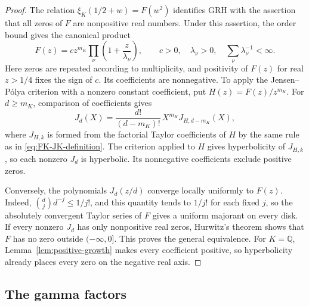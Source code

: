 \documentclass[11pt,reqno]{amsart}
\numberwithin{equation}{section}
\begin{document}
\begin{proof}
The relation $\xi_K(1/2+w)=F(w^2)$ identifies GRH with the
assertion that all zeros of $F$ are nonpositive real numbers.
Under this assertion, the order bound gives the canonical product
\[
 F(z)=c z^{m_K}\prod_{\nu}\left(1+\frac z{\lambda_\nu}\right),
 \qquad c>0,\quad \lambda_\nu>0,\quad
 \sum_\nu\lambda_\nu^{-1}<\infty.
\]
Here zeros are repeated according to multiplicity, and positivity
of $F(z)$ for real $z>1/4$ fixes the sign of $c$.
Its coefficients are nonnegative. To apply the Jensen--P\'olya
criterion with a nonzero constant coefficient, put $H(z)=F(z)/z^{m_K}$.
For $d\ge m_K$, comparison of coefficients gives
\[
 J_d(X)=\frac{d!}{(d-m_K)!}\,X^{m_K}J_{H,d-m_K}(X),
\]
where $J_{H,k}$ is formed from the factorial Taylor coefficients
of $H$ by the same rule as in \eqref{eq:FK-JK-definition}.
The criterion applied to $H$ gives hyperbolicity of $J_{H,k}$,
so each nonzero $J_d$ is hyperbolic. Its nonnegative coefficients
exclude positive zeros.

Conversely, the polynomials $J_d(z/d)$ converge locally uniformly
to $F(z)$. Indeed, $\binom dj d^{-j}\le1/j!$, and this quantity
tends to $1/j!$ for each fixed $j$, so the absolutely convergent
Taylor series of $F$ gives a uniform majorant on every disk.
If every nonzero $J_d$ has only nonpositive real zeros, Hurwitz's
theorem shows that $F$ has no zero outside $(-\infty,0]$.
This proves the general equivalence. For $K=\mathbb Q$,
Lemma~\ref{lem:positive-growth} makes every coefficient
positive, so hyperbolicity already places every zero on the
negative real axis.
\end{proof}


\subsection{The gamma factors}
\end{document}
